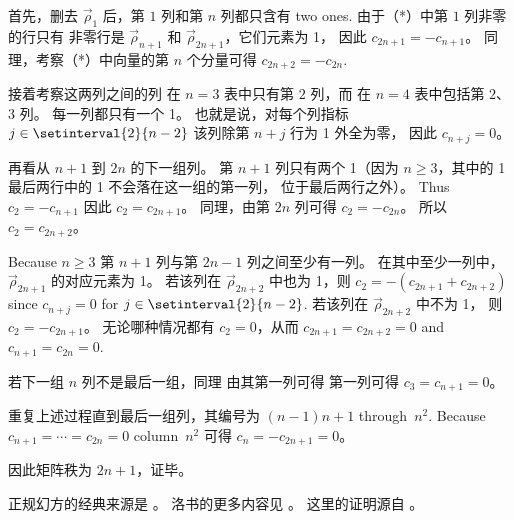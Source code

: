 首先，删去 $\vec{\rho}_1$ 后，第 $1$ 列和第 $n$ 列都只含有
two ones.
由于（*）中第 $1$ 列非零的行只有
非零行是 $\vec{\rho}_{n+1}$ 和 $\vec{\rho}_{2n+1}$，它们元素为 1，
因此 $c_{2n+1}=-c_{n+1}$。
同理，考察（*）中向量的第 $n$ 个分量可得
$c_{2n+2}=-c_{2n}$.

接着考察这两列之间的列\Dash
在 $n=3$ 表中只有第 $2$ 列，而
在 $n=4$ 表中包括第 $2$、$3$ 列。
每一列都只有一个 1。
也就是说，对每个列指标 $j\in\setinterval{2}{n-2}$
该列除第 $n+j$ 行为 1 外全为零，
因此 $c_{n+j}=0$。

再看从 $n+1$ 到 $2n$ 的下一组列。
第 $n+1$ 列只有两个 1（因为 $n\geq3$，其中的 1
最后两行中的 1 不会落在这一组的第一列，
位于最后两行之外）。 
Thus $c_2=-c_{n+1}$
因此 $c_2=c_{2n+1}$。
同理，由第 $2n$ 列可得 $c_2=-c_{2n}$。
所以 $c_2=c_{2n+2}$。  

Because $n\geq 3$
第 $n+1$ 列与第 $2n-1$ 列之间至少有一列。
在其中至少一列中，$\vec{\rho}_{2n+1}$ 的对应元素为 1。
若该列在 $\vec{\rho}_{2n+2}$ 中也为 1，则
$c_2=-(c_{2n+1}+c_{2n+2})$ 
since $c_{n+j}=0$ for $j\in\setinterval{2}{n-2}$.
若该列在 $\vec{\rho}_{2n+2}$ 中不为 1，
则 $c_2=-c_{2n+1}$。
无论哪种情况都有 $c_2=0$，从而
$c_{2n+1}=c_{2n+2}=0$ and  
$c_{n+1}=c_{2n}=0$.

若下一组 $n$ 列不是最后一组，同理
由其第一列可得
第一列可得 $c_3=c_{n+1}=0$。

重复上述过程直到最后一组列，其编号为
$(n-1)n+1$ through~$n^2$.
Because $c_{n+1}=\cdots=c_{2n}=0$ column~$n^2$ 
可得 $c_n=-c_{2n+1}=0$。

因此矩阵秩为 $2n+1$，证毕。

\medskip
正规幻方的经典来源是 \cite{Ball}。
洛书的更多内容见 \cite{WikipediaLoShuSquare}。
这里的证明源自 \cite{Ward}。

